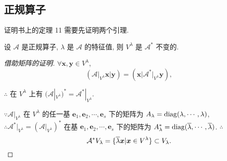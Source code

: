 \documentclass[color=black,device=normal,lang=cn,mode=geye]{elegantnote}
\begin{document}
\subsection{正规算子}
证明书上的定理 11 需要先证明两个引理.
\begin{lemma}\label{l3.2}
    设 $\mathcal{A}$ 是正规算子, $\lambda$ 是 $\mathcal{A}$ 的特征值, 则 $V^\lambda$ 是 $\mathcal{A}^*$ 不变的.
\end{lemma}
\begin{proof}[借助矩阵的证明]
    $\forall\boldsymbol{x},\boldsymbol{y}\in V^\lambda$,
    \[\left(\mathcal{A}|_{V^\lambda}\boldsymbol{x}\Big|\boldsymbol{y}\right)=\left(\boldsymbol{x}\Big|\mathcal{A}^*|_{V^\lambda}\boldsymbol{y}\right),\]

    $\therefore$ 在 $V^\lambda$ 上有 $(\mathcal{A}|_{V^\lambda})^*=\mathcal{A}^*|_{V^\lambda}$.

    $\because\mathcal{A}|_{V^\lambda}$ 在 $V^\lambda$ 的任一基 $\boldsymbol{e}_1,\boldsymbol{e}_2,\cdots,\boldsymbol{e}_s$ 下的矩阵为 $A_\lambda=\operatorname{diag} (\lambda,\cdots,\lambda)$, $\therefore\mathcal{A}^*|_{V^\lambda}=(\mathcal{A}|_{V^\lambda})^*$ 在基 $\boldsymbol{e}_1,\boldsymbol{e}_2,\cdots,\boldsymbol{e}_s$ 下的矩阵为 $A_\lambda^*=\operatorname{diag} (\overline{\lambda},\cdots,\overline{\lambda})$. $\therefore$
    \[\mathcal{A}^*V_\lambda=\{\overline{\lambda}\boldsymbol{x}|\boldsymbol{x}\in V^\lambda\}\subset V_\lambda.\qedhere\]
\end{proof}
\end{document}
